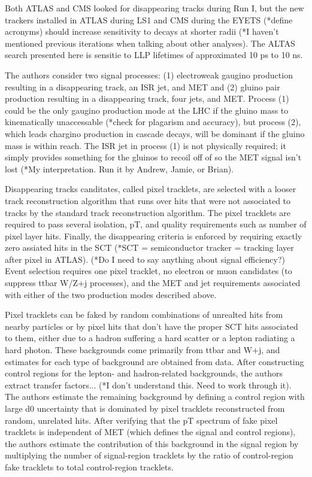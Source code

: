 \documentclass[12pt]{article}
\begin{document}
    Both ATLAS and CMS looked for disappearing tracks during Run I, but the new trackers installed in ATLAS during LS1 and CMS during the EYETS (*define acronyms) should increase sensitivity to decays at shorter radii (*I haven't mentioned previous iterations when talking about other analyses). The ALTAS search presented here is sensitie to LLP lifetimes of approximated 10 ps to 10 ns.

    The authors consider two signal processes: (1) electroweak gaugino production resulting in a disappearing track, an ISR jet, and MET and (2) gluino pair production resulting in a disappearing track, four jets, and MET. Process (1) could be the only gaugino production mode at the LHC if the gluino mass to kinematically unaccessable (*check for plagarism and accuracy), but process (2), which leads chargino production in cascade decays,  will be dominant if the gluino mass is within reach. The ISR jet in process (1) is not physically required; it simply provides something for the gluinos to recoil off of so the MET signal isn't lost (*My interpretation. Run it by Andrew, Jamie, or Brian).

    Disappearing tracks canditates, called pixel tracklets, are selected with a looser track reconstruction algorithm that runs over hits that were not associated to tracks by the standard track reconstruction algorithm. The pixel tracklets are required to pass several isolation, pT, and quality requirements such as number of pixel layer hits. Finally, the disappearing criteria is enforced by requiring exactly zero assiated hits in the SCT (*SCT = semiconductor tracker = tracking layer after pixel in ATLAS). (*Do I need to say anything about signal efficiency?) Event selection requires one pixel tracklet, no electron or muon candidates (to suppress ttbar W/Z+j processes), and the MET and jet requirements associated with either of the two production modes described above.
    
    Pixel tracklets can be faked by random combinations of unrealted hits from nearby particles or by pixel hits that don't have the proper SCT hits associated to them, either due to a hadron suffering a hard scatter or a lepton radiating a hard photon. These backgrounds come primarily from ttbar and W+j, and estimates for each type of background are obtained from data. After constructing control regions for the lepton- and hadron-related backgrounds, the authors extract transfer factors... (*I don't understand this. Need to work through it). The authors estimate the remaining background by defining a control region with large d0 uncertainty that is dominated by pixel tracklets reconstructed from random, unrelated hits. After verifying that the pT spectrum of fake pixel tracklets is independent of MET (which defines the signal and control regions), the authors estimate the contribution of this background in the signal region by multiplying the number of signal-region tracklets by the ratio of control-region fake tracklets to total control-region tracklets.
\end{document}
